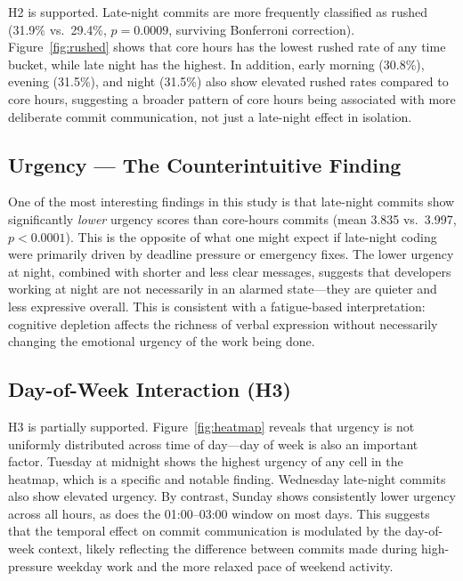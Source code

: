 \documentclass[sigconf]{acmart}
\begin{document}
H2 is supported. Late-night commits are more frequently classified as rushed (31.9\% vs.\ 29.4\%, $p = 0.0009$, surviving Bonferroni correction). Figure~\ref{fig:rushed} shows that core hours has the lowest rushed rate of any time bucket, while late night has the highest. In addition, early morning (30.8\%), evening (31.5\%), and night (31.5\%) also show elevated rushed rates compared to core hours, suggesting a broader pattern of core hours being associated with more deliberate commit communication, not just a late-night effect in isolation.


\subsection{Urgency --- The Counterintuitive Finding}

One of the most interesting findings in this study is that late-night commits show significantly \emph{lower} urgency scores than core-hours commits (mean 3.835 vs.\ 3.997, $p < 0.0001$). This is the opposite of what one might expect if late-night coding were primarily driven by deadline pressure or emergency fixes. The lower urgency at night, combined with shorter and less clear messages, suggests that developers working at night are not necessarily in an alarmed state---they are quieter and less expressive overall. This is consistent with a fatigue-based interpretation: cognitive depletion affects the richness of verbal expression without necessarily changing the emotional urgency of the work being done.

\subsection{Day-of-Week Interaction (H3)}

H3 is partially supported. Figure~\ref{fig:heatmap} reveals that urgency is not uniformly distributed across time of day---day of week is also an important factor. Tuesday at midnight shows the highest urgency of any cell in the heatmap, which is a specific and notable finding. Wednesday late-night commits also show elevated urgency. By contrast, Sunday shows consistently lower urgency across all hours, as does the 01:00--03:00 window on most days. This suggests that the temporal effect on commit communication is modulated by the day-of-week context, likely reflecting the difference between commits made during high-pressure weekday work and the more relaxed pace of weekend activity.
\end{document}
